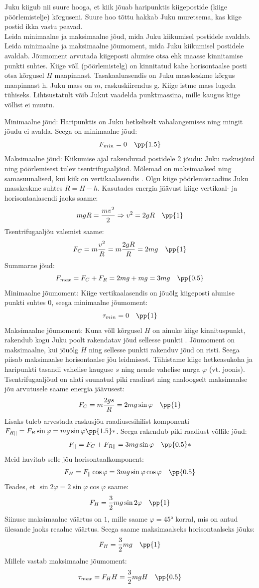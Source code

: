 \setAuthor{}

Juku kiigub  nii suure hooga, et kiik jõuab haripunktis kiigepostide (kiige pöörlemistelje) kõrguseni. Suure hoo tõttu hakkab Juku muretsema, kas kiige postid ikka vastu peavad.\\
\osa Leida minimaalne ja maksimaalne jõud, mida Juku kiikumisel postidele avaldab.\\
\osa Leida minimaalne ja maksimaalne jõumoment, mida Juku kiikumisel postidele avaldab. Jõumoment arvutada kiigeposti alumise otsa ehk maasse kinnitamise punkti suhtes.
Kiige võll (pöörlemistelg) on kinnitatud kahe horisontaalse posti otsa kõrgusel $H$ maapinnast. Tasakaaluasendis on Juku masskeskme kõrgus maapinnast h. Juku mass on $m$, raskuskiirendus g. Kiige istme mass lugeda tühiseks. Lihtsustatult võib Jukut vaadelda punktmassina, mille kaugus kiige võllist ei muutu. 



\hint

\solu
\osa Minimaalne jõud: Haripunktis on Juku hetkeliselt vabalangemises ning mingit jõudu ei avalda. Seega on minimaalne jõud: 
$$F_{min} = 0 \quad\pp{1.5}$$ 
Maksimaalne jõud: Kiikumise ajal rakenduvad postidele 2 jõudu: Juku raskusjõud ning pöörlemisest tulev tsentrifugaaljõud. Mõlemad on maksimaalsed ning samasuunalised, kui kiik on vertikaalasendis . Olgu kiige pöörlemisraadius Juku masskeskme suhtes $R = H-h$. Kasutades energia jäävust kiige vertikaal- ja horisontaalasendi jaoks saame: 
$$mgR = \frac{mv^2}{2} \Rightarrow v^2 = 2gR \quad\pp{1}$$ 
Tsentrifugaaljõu valemist saame:
$$F_C = m\frac{v^2}{R} = m\frac{2gR}{R} = 2mg \quad\pp{1}$$ 
Summarne jõud:
$$F_{max} = F_C + F_R = 2mg + mg = 3mg \quad\pp{0.5}$$ 
\osa Minimaalne jõumoment: Kiige vertikaalasendis on jõuõlg kiigeposti alumise punkti suhtes $0$, seega minimaalne jõumoment:
$$\tau_{min} = 0\quad\pp{1}$$ 
Maksimaalne jõumoment: Kuna võll kõrgusel $H$ on ainuke kiige kinnituspunkt, rakendub kogu Juku poolt rakendatav jõud sellesse punkti . Jõumoment on maksimaalne, kui jõuõlg $H$ ning sellesse punkti rakenduv jõud on risti. Seega piisab maksimaalse horisontaalse jõu leidmisest. Tähistame kiige hetkeasukoha ja haripunkti tasandi vahelise kauguse $s$ ning nende vahelise nurga $\varphi$ (vt. joonis). Tsentrifugaaljõud on alati suunatud piki raadiust ning analoogselt maksimaalse jõu arvutusele saame energia jäävusest:
$$F_C = m\frac{2gs}{R} = 2mg\sin{\varphi}\quad\pp{1}$$ 
Lisaks tuleb arvestada raskusjõu raadiusesihilist komponenti $F_{R||} = F_R\sin{\varphi} = mg\sin{\varphi}\pp{1.5}*$.
Seega rakendub piki raadiust võllile jõud:
$$F_{||} = F_C + F_{R||} = 3mg\sin{\varphi}\quad\pp{0.5}*$$ 
Meid huvitab selle jõu horisontaalkomponent:
$$F_H = F_{||}\cos{\varphi} = 3mg\sin{\varphi}\cos{\varphi}\quad\pp{0.5}$$ 
Teades, et $\sin{2\varphi}=2\sin{\varphi}\cos{\varphi}$ saame:
$$F_H = \frac{3}{2}mg\sin{2\varphi}\quad\pp{1}$$ 
Siinuse maksimaalne väärtus on $1$, mille saame $\varphi = \ang{45}$ korral, mis on antud ülesande jaoks reaalne väärtus. Seega saame maksimaalseks horisontaalseks jõuks:
$$F_H = \frac{3}{2}mg\quad\pp{1}$$ 
Millele vastab maksimaalne jõumoment:
$$\tau_{max} = F_HH = \frac{3}{2}mgH\quad\pp{0.5}$$ 

